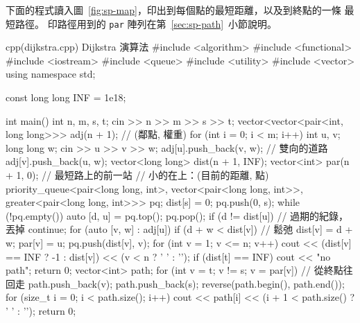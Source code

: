 下面的程式讀入圖~\ref{fig:sp-map}，印出到每個點的最短距離，以及到終點的一條
最短路徑。 印路徑用到的 \texttt{par} 陣列在第~\ref{sec:sp-path}~小節說明。

\begin{example}[label=ex:sp-dijkstra]{cpp}{(dijkstra.cpp) Dijkstra 演算法}
#include <algorithm>
#include <functional>
#include <iostream>
#include <queue>
#include <utility>
#include <vector>
using namespace std;

const long long INF = 1e18;

int main() {
    int n, m, s, t;
    cin >> n >> m >> s >> t;
    vector<vector<pair<int, long long>>> adj(n + 1);   // (鄰點, 權重)
    for (int i = 0; i < m; i++) {
        int u, v;
        long long w;
        cin >> u >> v >> w;
        adj[u].push_back({v, w});                      // 雙向的道路
        adj[v].push_back({u, w});
    }
    vector<long long> dist(n + 1, INF);
    vector<int> par(n + 1, 0);                         // 最短路上的前一站
    // 小的在上：(目前的距離, 點)
    priority_queue<pair<long long, int>, vector<pair<long long, int>>,
                   greater<pair<long long, int>>> pq;
    dist[s] = 0;
    pq.push({0, s});
    while (!pq.empty()) {
        auto [d, u] = pq.top();
        pq.pop();
        if (d != dist[u]) {                            // 過期的紀錄，丟掉
            continue;
        }
        for (auto [v, w] : adj[u]) {
            if (d + w < dist[v]) {                     // 鬆弛
                dist[v] = d + w;
                par[v] = u;
                pq.push({dist[v], v});
            }
        }
    }
    for (int v = 1; v <= n; v++) {
        cout << (dist[v] == INF ? -1 : dist[v]) << (v < n ? ' ' : '\n');
    }
    if (dist[t] == INF) {
        cout << "no path\n";
        return 0;
    }
    vector<int> path;
    for (int v = t; v != s; v = par[v]) {              // 從終點往回走
        path.push_back(v);
    }
    path.push_back(s);
    reverse(path.begin(), path.end());
    for (size_t i = 0; i < path.size(); i++) {
        cout << path[i] << (i + 1 < path.size() ? ' ' : '\n');
    }
    return 0;
}
\end{example}


